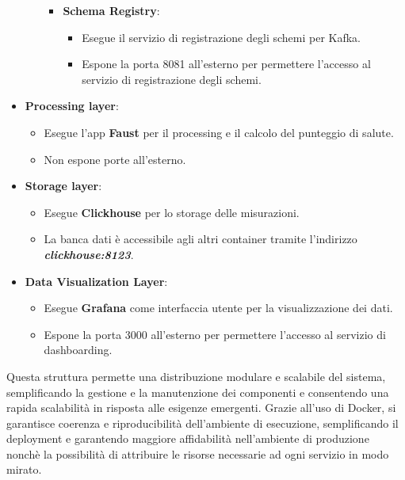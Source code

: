 \begin{itemize}
\begin{itemize}
\begin{itemize}
                \item \textbf{Schema Registry}:
                \begin{itemize}
                    \item Esegue il servizio di registrazione degli schemi per Kafka.
                    \item Espone la porta 8081 all'esterno per permettere l'accesso al servizio di registrazione degli schemi.
                \end{itemize}
            \end{itemize}
    \end{itemize} 
    \item \textbf{Processing layer}:
    \begin{itemize}
        \item Esegue l'app \textbf{Faust} per il processing e il calcolo del punteggio di salute.
        \item Non espone porte all'esterno.
    \end{itemize}
    \item \textbf{Storage layer}:
    \begin{itemize}
        \item Esegue \textbf{Clickhouse} per lo storage delle misurazioni.
        \item La banca dati è accessibile agli altri container tramite l'indirizzo \textit{\textbf{clickhouse:8123}}.
    \end{itemize}
    \item \textbf{Data Visualization Layer}:
    \begin{itemize}
        \item Esegue \textbf{Grafana} come interfaccia utente per la visualizzazione dei dati.
        \item Espone la porta 3000 all'esterno per permettere l'accesso al servizio di dashboarding.
    \end{itemize}
\end{itemize}
Questa struttura permette una distribuzione modulare e scalabile del sistema, semplificando la gestione e la manutenzione dei componenti e consentendo una rapida scalabilità in risposta alle esigenze emergenti. Grazie all'uso di Docker, si garantisce coerenza e riproducibilità dell'ambiente di esecuzione, semplificando il deployment e garantendo maggiore affidabilità nell'ambiente di produzione nonchè la possibilità di attribuire le risorse necessarie ad ogni servizio in modo mirato.


